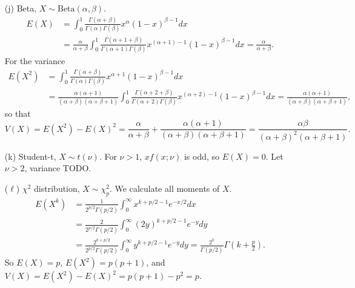 \begin{itemize}
\item[(j)] Beta, $X \sim \mathrm{Beta}(\alpha, \beta)$.
\begin{equation*}
\begin{split}
E(X) &= \int_0^1 \frac{\Gamma(\alpha + \beta)}{\Gamma(\alpha) \Gamma(\beta)} x^{\alpha} (1 - x)^{\beta - 1} dx \\
    &= \frac{\alpha}{\alpha + \beta} \int_0^1 \frac{\Gamma(\alpha + 1 + \beta)}{\Gamma(\alpha + 1) \Gamma(\beta)} x^{(\alpha + 1) - 1} (1 - x)^{\beta - 1} dx
    = \frac{\alpha}{\alpha + \beta}.
\end{split}
\end{equation*}
For the variance
\begin{equation*}
\begin{split}
E(X^2) &= \int_0^1 \frac{\Gamma(\alpha + \beta)}{\Gamma(\alpha) \Gamma(\beta)} x^{\alpha + 1} (1 - x)^{\beta - 1} dx \\
    &= \frac{\alpha (\alpha + 1)}{(\alpha + \beta)(\alpha + \beta + 1)} \int_0^1 \frac{\Gamma(\alpha + 2 + \beta)}{\Gamma(\alpha + 2) \Gamma(\beta)} x^{(\alpha + 2) - 1} (1 - x)^{\beta - 1} dx
    = \frac{\alpha(\alpha + 1)}{(\alpha + \beta)(\alpha + \beta + 1)},
\end{split}
\end{equation*}
so that
\begin{equation*}
V(X) = E(X^2) - E(X)^2
    = \frac{\alpha}{\alpha + \beta} + \frac{\alpha(\alpha + 1)}{(\alpha + \beta)(\alpha + \beta + 1)}
    = \frac{\alpha \beta}{(\alpha + \beta)^2(\alpha + \beta + 1)}.
\end{equation*}

\item[(k)] Student-t, $X \sim t(\nu)$.
For $\nu > 1$, $xf(x;\nu)$ is odd, so $E(X) = 0$.
Let $\nu > 2$, variance TODO.

\item[($\ell$)] $\chi^2$ distribution, $X \sim \chi^2_p$.
We calculate all moments of $X$.
\begin{equation*}
\begin{split}
E(X^k) &= \frac{1}{2^{p/2} \Gamma(p/2)} \int_0^{\infty} x^{k + p/2 - 1} e^{-x/2} dx \\
    &= \frac{2}{2^{p/2} \Gamma(p/2)} \int_0^{\infty} (2y)^{k + p/2 - 1} e^{-y} dy \\
    &= \frac{2^{k + p/2}}{2^{p/2} \Gamma(p/2)} \int_0^{\infty} y^{k + p/2 - 1} e^{-y} dy
    = \frac{2^{k}}{\Gamma(p/2)} \Gamma\left(k + \frac{p}{2}\right).
\end{split}
\end{equation*}
So $E(X) = p$, $E(X^2) = p(p + 1)$, and $V(X) = E(X^2) - E(X)^2 = p(p + 1) - p^2 = p$.


\end{itemize}
